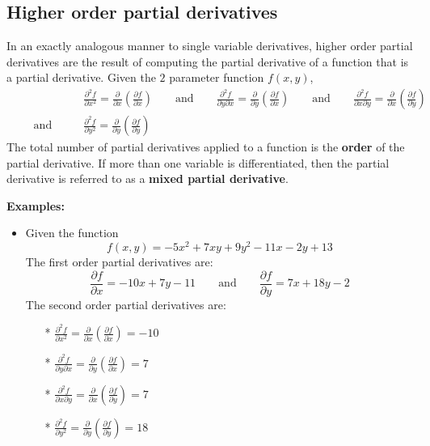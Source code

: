 \documentclass{article}
\begin{document}
\subsection*{Higher order partial derivatives}

In an exactly analogous manner to single variable derivatives, higher order partial derivatives are the result of computing the partial derivative of a function that is a partial derivative. Given the \(2\) parameter function \(f(x, y)\), 
\begin{align*}
& \frac{\partial^2 f}{\partial x^2} = \frac{\partial}{\partial x}\left(\frac{\partial f}{\partial x}\right) 
\quad\quad\text{and}\quad\quad
\frac{\partial^2 f}{\partial y \partial x} = \frac{\partial}{\partial y}\left(\frac{\partial f}{\partial x}\right)
\quad\quad\text{and}\quad\quad 
\frac{\partial^2 f}{\partial x \partial y} = \frac{\partial}{\partial x}\left(\frac{\partial f}{\partial y}\right) \\
\quad\quad\text{and}\quad\quad 
& \frac{\partial^2 f}{\partial y^2} = \frac{\partial}{\partial y}\left(\frac{\partial f}{\partial y}\right)
\end{align*}   
The total number of partial derivatives applied to a function is the {\bf order} of the partial derivative. If more than one variable is differentiated, then the partial derivative is referred to as a {\bf mixed partial derivative}.

\vspace{5mm}

\textbf{Examples:}
\begin{itemize}
\item Given the function 
\[f(x, y) = -5x^2 + 7xy + 9y^2 - 11x - 2y + 13\]  
The first order partial derivatives are:
\[\frac{\partial f}{\partial x} = -10x + 7y - 11 \quad\quad\text{and}\quad\quad \frac{\partial f}{\partial y} = 7x + 18y - 2\]  
The second order partial derivatives are: 
\begin{itemize}
\item[*] \(\frac{\partial^2 f}{\partial x^2} = \frac{\partial}{\partial x}\left(\frac{\partial f}{\partial x}\right) = -10\)
\item[*] \(\frac{\partial^2 f}{\partial y \partial x} = \frac{\partial}{\partial y}\left(\frac{\partial f}{\partial x}\right) = 7\)
\item[*] \(\frac{\partial^2 f}{\partial x \partial y} = \frac{\partial}{\partial x}\left(\frac{\partial f}{\partial y}\right) = 7\)
\item[*] \(\frac{\partial^2 f}{\partial y^2} = \frac{\partial}{\partial y}\left(\frac{\partial f}{\partial y}\right) = 18\)   
\end{itemize}
\end{itemize}
\end{document}
